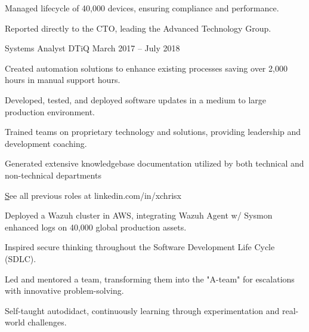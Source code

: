 \documentclass[]{resume-format}
\begin{document}
\begin{cventries}
{\begin{cvitems}
        \item { Managed lifecycle of 40,000 devices, ensuring compliance and performance. }
        \item { Reported directly to the CTO, leading the Advanced Technology Group. }
    \end{cvitems}}
    \cventry
    { Systems Analyst }
    { DTiQ }
    {}
    { March 2017 – July 2018 }
    {\begin{cvitems}
        \item { Created automation solutions to enhance existing processes saving over 2,000 hours in manual support hours. }
        \item { Developed, tested, and deployed software updates in a medium to large production environment. }
        \item { Trained teams on proprietary technology and solutions, providing leadership and development coaching. }
        \item { Generated extensive knowledgebase documentation utilized by both technical and non-technical departments }
    \end{cvitems}}
\end{cventries}

    \vspace{-5mm}
    \begin{flushright}
        \small\color{lightgray} \href{ https://linkedin.com/in/xchrisx }See all previous roles at linkedin.com/in/xchrisx
    \end{flushright}




\begin{cvachievements}
    \item { Deployed a Wazuh cluster in AWS, integrating Wazuh Agent w/ Sysmon enhanced logs on 40,000 global production assets. }
    \item { Inspired secure thinking throughout the Software Development Life Cycle (SDLC). }
    \item { Led and mentored a team, transforming them into the "A-team" for escalations with innovative problem-solving. }
    \item { Self-taught autodidact, continuously learning through experimentation and real-world challenges. }
\end{cvachievements}
\end{document}
